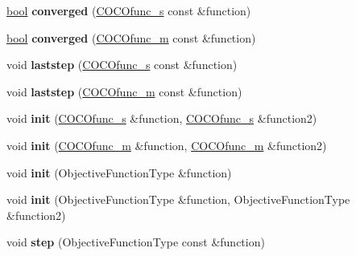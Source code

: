 \begin{DoxyCompactItemize}
\item 
\hyperlink{classbool}{bool} {\bfseries converged} (\hyperlink{classCOCOfunc__s}{C\+O\+C\+Ofunc\+\_\+s} const \&function)\hypertarget{classpreselect_a36ffc53516bace899d29f063b65f2c48}{}\label{classpreselect_a36ffc53516bace899d29f063b65f2c48}

\item 
\hyperlink{classbool}{bool} {\bfseries converged} (\hyperlink{classCOCOfunc__m}{C\+O\+C\+Ofunc\+\_\+m} const \&function)\hypertarget{classpreselect_accb8ccbf85e0589c4cc3b8c77ec5433a}{}\label{classpreselect_accb8ccbf85e0589c4cc3b8c77ec5433a}

\item 
void {\bfseries laststep} (\hyperlink{classCOCOfunc__s}{C\+O\+C\+Ofunc\+\_\+s} const \&function)\hypertarget{classpreselect_a08f8f3068f304148c0184dd4cb478c2e}{}\label{classpreselect_a08f8f3068f304148c0184dd4cb478c2e}

\item 
void {\bfseries laststep} (\hyperlink{classCOCOfunc__m}{C\+O\+C\+Ofunc\+\_\+m} const \&function)\hypertarget{classpreselect_a41b5f2a27c4512ec9d7614ce40607f53}{}\label{classpreselect_a41b5f2a27c4512ec9d7614ce40607f53}

\item 
void {\bfseries init} (\hyperlink{classCOCOfunc__s}{C\+O\+C\+Ofunc\+\_\+s} \&function, \hyperlink{classCOCOfunc__s}{C\+O\+C\+Ofunc\+\_\+s} \&function2)\hypertarget{classpreselect_a2cda8b8db9528373521679a9578c861d}{}\label{classpreselect_a2cda8b8db9528373521679a9578c861d}

\item 
void {\bfseries init} (\hyperlink{classCOCOfunc__m}{C\+O\+C\+Ofunc\+\_\+m} \&function, \hyperlink{classCOCOfunc__m}{C\+O\+C\+Ofunc\+\_\+m} \&function2)\hypertarget{classpreselect_a7ea1660c528a49ace308390d53ac6c46}{}\label{classpreselect_a7ea1660c528a49ace308390d53ac6c46}

\item 
void {\bfseries init} (Objective\+Function\+Type \&function)\hypertarget{classCocoOptimiser_a0c7df5618e3fba607b32cf77190f49cb}{}\label{classCocoOptimiser_a0c7df5618e3fba607b32cf77190f49cb}

\item 
void {\bfseries init} (Objective\+Function\+Type \&function, Objective\+Function\+Type \&function2)\hypertarget{classCocoOptimiser_af261a238b756aeda91f891ca417ebe58}{}\label{classCocoOptimiser_af261a238b756aeda91f891ca417ebe58}

\item 
void {\bfseries step} (Objective\+Function\+Type const \&function)\hypertarget{classCocoOptimiser_ae48180f04b5b40318b4c52cd02862239}{}\label{classCocoOptimiser_ae48180f04b5b40318b4c52cd02862239}


\end{DoxyCompactItemize}
